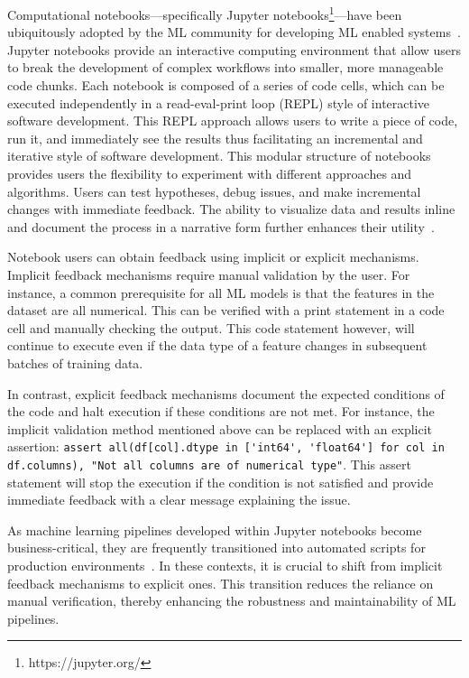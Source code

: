 \documentclass[smallextended]{svjour3}       %
\begin{document}
Computational notebooks---specifically Jupyter notebooks\footnote{https://jupyter.org/}---have been ubiquitously adopted by the ML community for developing ML enabled systems~\citep{pimentel2019large-scale,quaranta2021kgtorrent,psallidas2019data,perkel2018why}. Jupyter notebooks provide an interactive computing environment that allow users to break the development of complex workflows into smaller, more manageable code chunks. Each notebook is composed of a series of code cells, which can be executed independently in a read-eval-print loop (REPL) style of interactive software development. This REPL approach allows users to write a piece of code, run it, and immediately see the results thus facilitating an incremental and iterative style of software development. This modular structure of notebooks provides users the flexibility to experiment with different approaches and algorithms. Users can test hypotheses, debug issues, and make incremental changes with immediate feedback. The ability to visualize data and results inline and document the process in a narrative form further enhances their utility~\citep{kery2018story,head2019managing,rule2018exploration,chattopadhyay2020whats}.

Notebook users can obtain feedback using implicit or explicit mechanisms. Implicit feedback mechanisms require manual validation by the user. For instance, a common prerequisite for all ML models is that the features in the dataset are all numerical. This can be verified with a print statement in a code cell and manually checking the output. This code statement however, will continue to execute even if the data type of a feature changes in subsequent batches of training data.

In contrast, explicit feedback mechanisms document the expected conditions of the code and halt execution if these conditions are not met. For instance, the implicit validation method mentioned above can be replaced with an explicit assertion: \lstinline{assert all(df[col].dtype in ['int64', 'float64'] for col in df.columns), "Not all columns are of numerical type"}. This assert statement will stop the execution if the condition is not satisfied and provide immediate feedback with a clear message explaining the issue.

As machine learning pipelines developed within Jupyter notebooks become business-critical, they are frequently transitioned into automated scripts for production environments~\citep{kery2018story,rule2018exploration}. In these contexts, it is crucial to shift from implicit feedback mechanisms to explicit ones. This transition reduces the reliance on manual verification, thereby enhancing the robustness and maintainability of ML pipelines.
\end{document}
